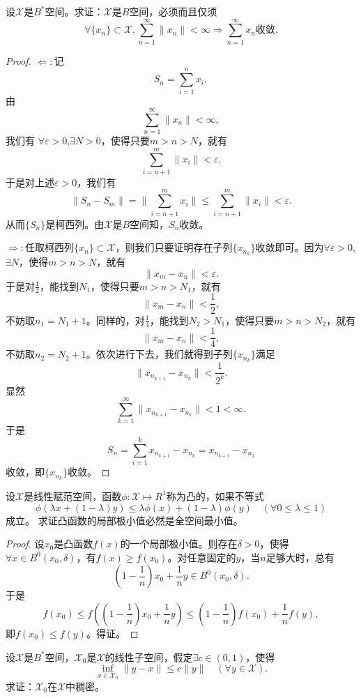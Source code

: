 \begin{exercise}
设$\mathscr{X}$是$B^*$空间。求证：$\mathscr{X}$是$B$空间，必须而且仅须
$$\forall \{x_n\}\subset\mathscr{X},\sum_{n=1}^{\infty}\|x_n\|<\infty\Longrightarrow\sum_{n=1}^{\infty}x_n\text{收敛}.$$
\end{exercise}

\begin{proof}
$\Leftarrow:$记$$S_n=\sum_{i=1}^{n}x_i,$$
由$$\sum_{n=1}^{\infty}\|x_n\|<\infty,$$我们有
$\forall\varepsilon>0$,$\exists N>0$，使得只要$m>n>N$，就有
$$\sum_{i=n+1}^{m}\|x_i\|<\varepsilon.$$于是对上述$\varepsilon>0$，我们有
$$\|S_n-S_m\|=\|\sum_{i=n+1}^{m}x_i\|\leq\sum_{i=n+1}^{m}\|x_i\|<\varepsilon.$$从而$\{S_n\}$是柯西列。由$\mathscr{X}$是$B$空间知，$S_n$收敛。

$\Rightarrow:$任取柯西列$\{x_n\}\subset\mathscr{X}$，则我们只要证明存在子列$\{x_{n_k}\}$收敛即可。因为$\forall\varepsilon>0$,$\exists N$，使得$m>n>N$，就有$$\|x_m-x_n\|<\varepsilon.$$于是对$\frac{1}{2}$，能找到$N_1$，使得只要$m>n>N_1$，就有$$\|x_m-x_n\|<\frac12,$$不妨取$n_1=N_1+1$。同样的，对$\frac{1}{4}$，能找到$N_2>N_1$，使得只要$m>n>N_2$，就有$$\|x_m-x_n\|<\frac{1}{4},$$不妨取$n_2=N_2+1$。依次进行下去，我们就得到子列$\{x_{n_k}\}$满足
$$\|x_{n_{k+1}}-x_{n_k}\|<\frac{1}{2^k}.$$
显然$$\sum_{k=1}^{\infty}\|x_{n_{k+1}}-x_{n_k}\|<1<\infty.$$于是$$S_n=\sum_{i=1}^{k}x_{n_{k+1}}-x_{n_k}=x_{n_{k+1}}-x_{n_1}$$收敛，即$\{x_{n_k}\}$收敛。
\end{proof}

\begin{exercise}
设$\mathscr{X}$是线性赋范空间，函数$\phi:\mathscr{X}\mapsto R^1$称为凸的，如果不等式
\begin{equation}\label{tu}
\phi(\lambda x+(1-\lambda)y)\leq\lambda\phi(x)+(1-\lambda)\phi(y)\quad(\forall 0\leq\lambda\leq1)
\end{equation}
成立。
求证凸函数的局部极小值必然是全空间最小值。
\end{exercise}

\begin{proof}
设$x_0$是凸函数$f(x)$的一个局部极小值。则存在$\delta>0$，使得$\forall x\in B^0(x_0,\delta)$，有$f(x)\geq f(x_0)$。对任意固定的$y$，当$n$足够大时，总有
$$(1-\frac{1}{n})x_0+\frac{1}{n}y\in B^0(x_0,\delta).$$
于是$$f(x_0)\leq f((1-\frac{1}{n})x_0+\frac{1}{n}y)\leq (1-\frac1n)f(x_0)+\frac{1}{n}f(y),$$
即$f(x_0)\leq f(y)$。得证。
\end{proof}

\begin{exercise}
设$\mathscr{X}$是$B^*$空间，$\mathscr{X}_0$是$\mathscr{X}$的线性子空间，假定$\exists c\in(0,1)$，使得
\begin{equation}
\inf_{x\in\mathscr{X}_0}\|y-x\|\leq c\|y\|\quad(\forall y\in\mathscr{X}).
\end{equation}
求证：$\mathscr{X}_0$在$\mathscr{X}$中稠密。
\end{exercise}


